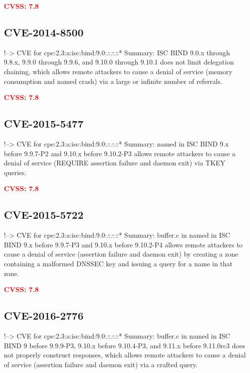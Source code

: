\documentclass[a4paper, 12pt]{article}
\begin{document}
\textbf{\textcolor{red}{CVSS: 7.8}}

\hypertarget{cve-2014-8500}{%
\subsection{CVE-2014-8500}\label{cve-2014-8500}}

!--\textgreater{} CVE for
cpe:2.3:a:isc:bind:9.0:\emph{:}:\emph{:}:\emph{:}:* Summary: ISC BIND
9.0.x through 9.8.x, 9.9.0 through 9.9.6, and 9.10.0 through 9.10.1 does
not limit delegation chaining, which allows remote attackers to cause a
denial of service (memory consumption and named crash) via a large or
infinite number of referrals.

\textbf{\textcolor{red}{CVSS: 7.8}}

\hypertarget{cve-2015-5477}{%
\subsection{CVE-2015-5477}\label{cve-2015-5477}}

!--\textgreater{} CVE for
cpe:2.3:a:isc:bind:9.0:\emph{:}:\emph{:}:\emph{:}:* Summary: named in
ISC BIND 9.x before 9.9.7-P2 and 9.10.x before 9.10.2-P3 allows remote
attackers to cause a denial of service (REQUIRE assertion failure and
daemon exit) via TKEY queries.

\textbf{\textcolor{red}{CVSS: 7.8}}

\hypertarget{cve-2015-5722}{%
\subsection{CVE-2015-5722}\label{cve-2015-5722}}

!--\textgreater{} CVE for
cpe:2.3:a:isc:bind:9.0:\emph{:}:\emph{:}:\emph{:}:* Summary: buffer.c in
named in ISC BIND 9.x before 9.9.7-P3 and 9.10.x before 9.10.2-P4 allows
remote attackers to cause a denial of service (assertion failure and
daemon exit) by creating a zone containing a malformed DNSSEC key and
issuing a query for a name in that zone.

\textbf{\textcolor{red}{CVSS: 7.8}}

\hypertarget{cve-2016-2776}{%
\subsection{CVE-2016-2776}\label{cve-2016-2776}}

!--\textgreater{} CVE for
cpe:2.3:a:isc:bind:9.0:\emph{:}:\emph{:}:\emph{:}:* Summary: buffer.c in
named in ISC BIND 9 before 9.9.9-P3, 9.10.x before 9.10.4-P3, and 9.11.x
before 9.11.0rc3 does not properly construct responses, which allows
remote attackers to cause a denial of service (assertion failure and
daemon exit) via a crafted query.
\end{document}
